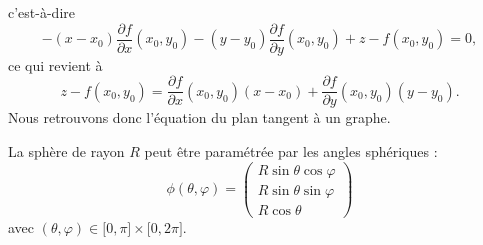 c'est-à-dire
\begin{equation}
	-(x-x_0)\frac{ \partial f }{ \partial x }(x_0,y_0)-(y-y_0)\frac{ \partial f }{ \partial y }(x_0,y_0)+z-f(x_0,y_0)=0,
\end{equation}
ce qui revient à
\begin{equation}
	z-f(x_0,y_0)=\frac{ \partial f }{ \partial x }(x_0,y_0)(x-x_0)+\frac{ \partial f }{ \partial y }(x_0,y_0)(y-y_0).
\end{equation}
Nous retrouvons donc l'équation du plan tangent à un graphe.

\begin{example}
	La sphère de rayon $R$ peut être paramétrée par les angles sphériques :
	\begin{equation}
		\phi(\theta,\varphi)=\begin{pmatrix}
			R\sin\theta\cos\varphi \\
			R\sin\theta\sin\varphi \\
			R\cos\theta
		\end{pmatrix}
	\end{equation}
	avec $(\theta,\varphi)\in\mathopen[ 0 , \pi \mathclose]\times \mathopen[ 0 , 2\pi \mathclose]$.


\end{example}
